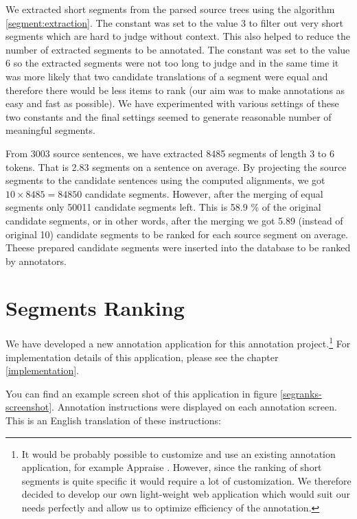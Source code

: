 We extracted short segments from the parsed source trees using the algorithm
\ref{segment:extraction}. The constant  was set to
the value 3 to filter out very short segments which are hard to judge without
context. This also helped to reduce the number of extracted segments to be
annotated. The constant  was set to the value 6 so
the extracted segments were not too long to judge and in the same time it was
more likely that two candidate translations of a segment were equal and
therefore there would be less items to rank (our aim was to make annotations as
easy and fast as possible). We have experimented with various settings of these
two constants and the final settings seemed to generate reasonable number of
meaningful segments.


From 3003 source sentences, we have extracted 8485 segments of length 3 to 6
tokens. That is  2.83 segments on a sentence on average. By
projecting the source segments to the candidate sentences using the computed
alignments, we got $10 \times 8485 = 84850$ candidate segments. However, after
the merging of equal segments only 50011 candidate segments left. This is 58.9
\% of the original candidate segments, or in other words, after the merging we
got 5.89 (instead of original 10) candidate segments to be ranked for each
source segment on average. Theese prepared candidate segments were inserted
into the database to be ranked by annotators.

\section{Segments Ranking}

We have developed a new annotation application for this annotation
project.\footnote{It would be probably possible to customize and use an
    existing annotation application, for example Appraise
    .  However, since the ranking of short segments is
    quite specific it would require a lot of customization. We therefore
decided to develop our own light-weight web application which would suit our
needs perfectly and allow us to optimize efficiency of the annotation.} For
implementation details of this application, please see the chapter
\ref{implementation}.

You can find an example screen shot of this application in figure
\ref{segranks-screenshot}. Annotation instructions were displayed on each
annotation screen. This is an English translation of these instructions:

